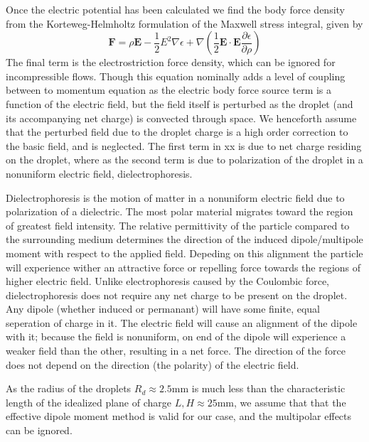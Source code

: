 \documentclass{jfm}
\begin{document}
Once the electric potential has been calculated we find the body force density from the Korteweg-Helmholtz formulation of the Maxwell stress integral, given by
\[ \mathbf{F} = \rho \mathbf{E} - \frac{1}{2}E^2 \nabla \epsilon + \nabla \left( \frac{1}{2}\mathbf{E} \cdot \mathbf{E} \frac{\partial \epsilon}{\partial \rho} \right) \]
The final term is the electrostriction force density, which can be ignored for incompressible flows. Though this equation nominally adds a level of coupling between to momentum equation as the electric body force source term is a function of the electric field, but the field itself is perturbed as the droplet (and its accompanying net charge) is convected through space. We henceforth assume that the perturbed field due to the droplet charge is a high order correction to the basic field, and is neglected. The first term in xx is due to net charge residing on the droplet, where as the second term is due to polarization of the droplet in a nonuniform electric field, dielectrophoresis.

Dielectrophoresis is the motion of matter in a nonuniform electric field due to polarization of a dielectric. The most polar material migrates toward the region of greatest field intensity. The relative permittivity of the particle compared to the surrounding medium determines the direction of the induced dipole/multipole moment with respect to the applied field. Depeding on this alignment the particle will experience wither an attractive force or repelling force towards the regions of higher electric field. Unlike electrophoresis caused by the Coulombic force, dielectrophoresis does not require any net charge to be present on the droplet. Any dipole (whether induced or permanant) will have some finite, equal seperation of charge in it. The electric field will cause an alignment of the dipole with it; because the field is nonuniform, on end of the dipole will experience a weaker field than the other, resulting in a net force. The direction of the force does not depend on the direction (the polarity) of the electric field.

As the radius of the droplets $R_d \approx 2.5$mm is much less than the characteristic length of the idealized plane of charge $L,H \approx 25$mm, we assume that that the effective dipole moment method is valid for our case, and the multipolar effects can be ignored.
\end{document}
